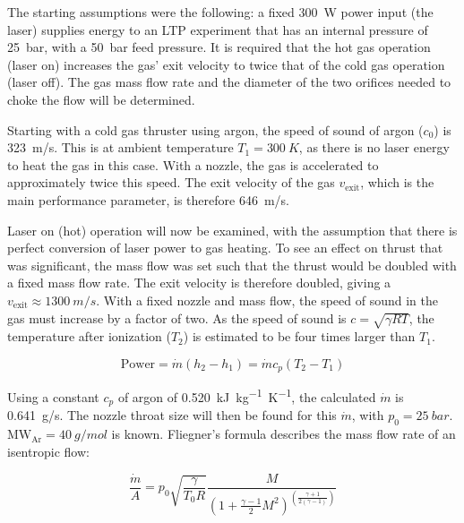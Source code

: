            The starting assumptions were the following: a fixed \qty{300}{W} power input (the laser) supplies energy to an LTP experiment that has an internal pressure of \qty{25}{bar}, with a \qty{50}{bar} feed pressure. It is required that the hot gas operation (laser on) increases the gas' exit velocity to twice that of the cold gas operation (laser off). The gas mass flow rate and the diameter of the two orifices needed to choke the flow will be determined.

            Starting with a cold gas thruster using argon, the speed of sound of argon ($c_0$) is \qty{323}{m/s}. This is at ambient temperature $T_1 = \qty{300}{K}$, as there is no laser energy to heat the gas in this case. With a nozzle, the gas is accelerated to approximately twice this speed. The exit velocity of the gas $v_\mathrm{exit}$, which is the main performance parameter, is therefore \qty{646}{m/s}.
            
            Laser on (hot) operation will now be examined, with the assumption that there is perfect conversion of laser power to gas heating. To see an effect on thrust that was significant, the mass flow was set such that the thrust would be doubled with a fixed mass flow rate. The exit velocity is therefore doubled, giving a $v_\mathrm{exit}\approx \qty{1300}{m/s}$. With a fixed nozzle and mass flow, the speed of sound in the gas must increase by a factor of two. As the speed of sound is $c = \sqrt{\gamma R T}$, the temperature after ionization ($T_2$) is estimated to be four times larger than $T_1$.

            \begin{equation}
                \text{Power} = \dot m (h_2-h_1)
                = \dot m c_p (T_2-T_1)
            \end{equation}
            
            Using a constant $c_p$ of argon of \qty{0.520}{kJ.kg^{-1}.K^{-1}}, the calculated $\dot m$ is \qty{0.641}{g/s}. The nozzle throat size will then be found for this $\dot m$, with $p_0 = \qty{25}{bar}$. $\mathrm{MW_{Ar}} = \qty{40}{g/mol}$ is known. Fliegner's formula describes the mass flow rate of an isentropic flow:
            
            \begin{equation}
                \frac{\dot m}{A} = p_0\sqrt{\frac{\gamma}{T_0 R}}\frac{M}{\left(1+\frac{\gamma-1}{2}M^2\right)^{\left(\frac{\gamma+1}{2(\gamma-1)}\right)}}
            \end{equation}

